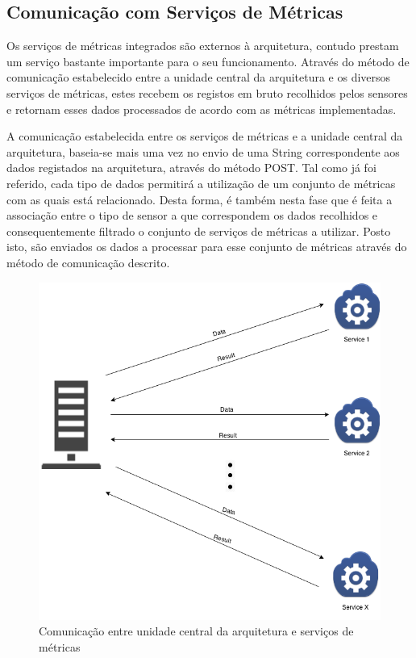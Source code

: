 \subsection{Comunicação com Serviços de Métricas}

Os serviços de métricas integrados são externos à arquitetura, contudo prestam um serviço bastante importante para o seu funcionamento. Através do método de comunicação estabelecido entre a unidade central da arquitetura e os diversos serviços de métricas, estes recebem os registos em bruto recolhidos pelos sensores e retornam esses dados processados de acordo com as métricas implementadas.

A comunicação estabelecida entre os serviços de métricas e a unidade central da arquitetura, baseia-se mais uma vez no envio de uma String correspondente aos dados registados na arquitetura, através do método POST. Tal como já foi referido, cada tipo de dados permitirá a utilização de um conjunto de métricas com as quais está relacionado. Desta forma, é também nesta fase que é feita a associação entre o tipo de sensor a que correspondem os dados recolhidos e consequentemente filtrado o conjunto de serviços de métricas a utilizar. Posto isto, são enviados os dados a processar para esse conjunto de métricas através do método de  comunicação descrito.

\begin{figure}[htb]
   \centering
   \includegraphics[scale=0.5]{Images/metricsdiagram.png}
   \caption{Comunicação entre unidade central da arquitetura e serviços de métricas}
\end{figure}


